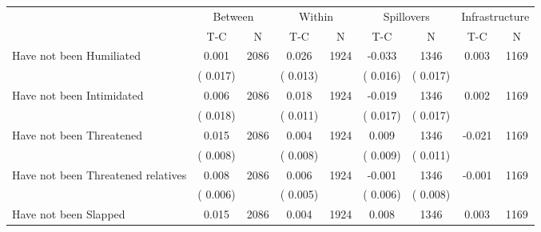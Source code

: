 
\begin{tabular}{l*{8}{c}}\hline&\multicolumn{2}{c}{Between}&\multicolumn{2}{c}{Within}&\multicolumn{2}{c}{Spillovers}&\multicolumn{2}{c}{Infrastructure}\\ \cmidrule(r){2-3}\cmidrule(l){4-5}\cmidrule(l){6-7}\cmidrule(l){8-9} & {T-C} & {N} & {T-C} & {N}  & {T-C}  & {N} & {T-C}  & {N} \\ \midrule
Have not been Humiliated        &              0.001      &       2086       &              0.026      &       1924       &             -0.033      &       1346  &        0.003 &       1169       \\
                       &       (       0.017)            &                               &       (       0.013)            &                               &       (       0.016)            &       (       0.017) &                  \\
Have not been Intimidated        &              0.006      &       2086       &              0.018      &       1924       &             -0.019      &       1346  &        0.002 &       1169       \\
                       &       (       0.018)            &                               &       (       0.011)            &                               &       (       0.017)            &       (       0.017) &                  \\
Have not been Threatened        &              0.015      &       2086       &              0.004      &       1924       &              0.009      &       1346  &       -0.021 &       1169       \\
                       &       (       0.008)            &                               &       (       0.008)            &                               &       (       0.009)            &       (       0.011) &                  \\
Have not been Threatened relatives        &              0.008      &       2086       &              0.006      &       1924       &             -0.001      &       1346  &       -0.001 &       1169       \\
                       &       (       0.006)            &                               &       (       0.005)            &                               &       (       0.006)            &       (       0.008) &                  \\
Have not been Slapped        &              0.015      &       2086       &              0.004      &       1924       &              0.008      &       1346  &        0.003 &       1169       \\

\end{tabular}
